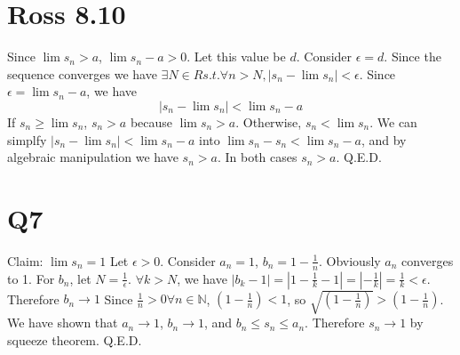 \documentclass[12pt]{article}
\newcommand{\N}{\mathbb{N}}
\begin{document}
\section{Ross 8.10}
Since $\lim s_n > a$, $\lim s_n - a > 0$. Let this value be $d$.
\newline
Consider $\epsilon = d$. Since the sequence converges we have $\exists N \in R s.t. \forall n > N, |s_n - \lim s_n|<\epsilon$. Since $\epsilon = \lim s_n - a$, we have
$$|s_n - \lim s_n| < \lim s_n - a$$
\newline
If $s_n \geq \lim s_n$, $s_n > a$ because $\lim s_n > a$.
\newline
Otherwise, $s_n < \lim s_n$. We can simplfy $|s_n - \lim s_n| < \lim s_n - a$ into $ \lim s_n - s_n < \lim s_n - a$, and by algebraic manipulation we have $s_n > a$.
\newline
In both cases $s_n > a$. Q.E.D.
\newpage


\section{Q7}
Claim: $\lim s_n = 1$
\newline
Let $\epsilon > 0$. Consider $a_n = 1$, $b_n = 1-\frac{1}{n}$. Obviously $a_n$ converges to 1.
\newline
For $b_n$, let $N = \frac{1}{\epsilon}$. $\forall k > N$, we have $|b_k - 1| = |1-\frac{1}{k}-1| = |-\frac{1}{k}| = \frac{1}{k} < \epsilon$. Therefore $b_n \to 1$
\newline
Since $\frac{1}{n} > 0 \forall n \in \N$, $(1-\frac{1}{n})<1$, so $\sqrt{(1-\frac{1}{n})} > (1-\frac{1}{n})$.
\newline
We have shown that $a_n \to 1$, $b_n \to 1$, and $b_n \leq s_n \leq a_n$. Therefore $s_n \to 1$ by squeeze theorem.
\newline
Q.E.D.
\end{document}
